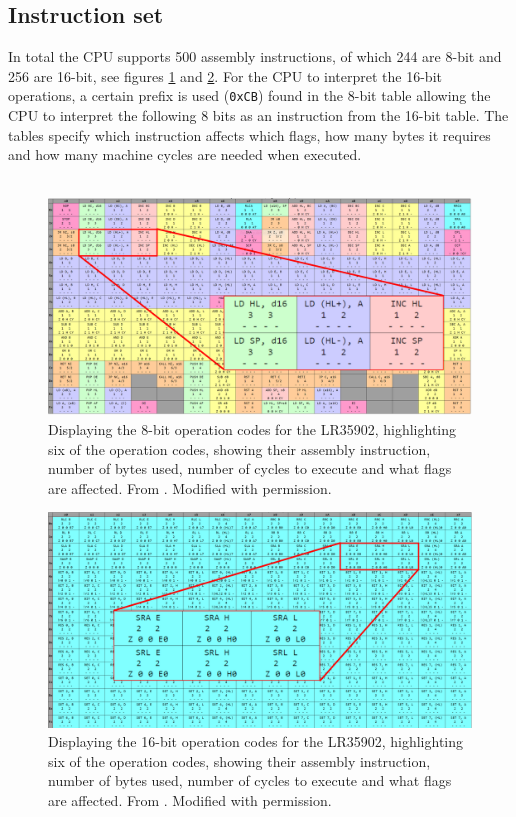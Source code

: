 \subsection{Instruction set}
In total the CPU supports 500 assembly instructions, of which 244 are 8-bit and 256 are 16-bit, see figures \ref{fig:8bitOpCodes} and \ref{fig:16bitOpCodes}. For the CPU to interpret the 16-bit operations, a certain prefix is used (\texttt{0xCB}) found in the 8-bit table allowing the CPU to interpret the following 8 bits as an instruction from the 16-bit table. The tables specify which instruction affects which flags, how many bytes it requires and how many machine cycles are needed when executed. 
\\\\
\begin{figure}[H]
    \centering
    \includegraphics[width=\textwidth]{figures/8bitOpCodes.PNG}
    \caption{Displaying the 8-bit operation codes for the LR35902, highlighting six of the operation codes, showing their assembly instruction, number of bytes used, number of cycles to execute and what flags are affected. From \cite{OpCodes}. Modified with permission.}
    \label{fig:8bitOpCodes}
\end{figure}


\begin{figure}[H]
    \centering
    \includegraphics[width=\textwidth]{figures/16bitOpCodes.PNG}
    \caption{Displaying the 16-bit operation codes for the LR35902, highlighting six of the operation codes, showing their assembly instruction, number of bytes used, number of cycles to execute and what flags are affected. From \cite{OpCodes}. Modified with permission.}
    \label{fig:16bitOpCodes}
\end{figure}
